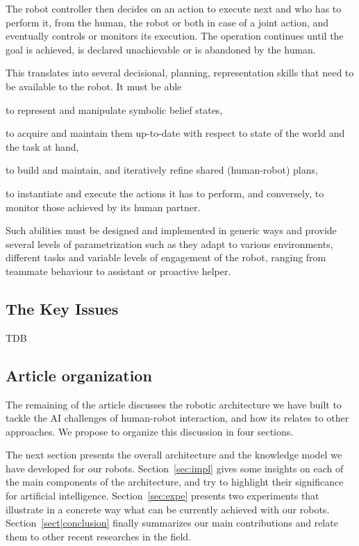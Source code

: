 \documentclass[preprint,3p,times]{elsarticle}
\begin{document}
The robot controller then decides on an action to execute next and who has to
perform it, from the human, the robot or both in case of a joint action, and
eventually controls or monitors its execution. The operation continues until the
goal is achieved, is declared unachievable or is abandoned by the human.

\begin{inparaenum}
This translates into several decisional, planning, representation skills that
need to be available to the robot. It must be able \item to represent and
manipulate symbolic belief states, \item to acquire and maintain them up-to-date
with respect to state of the world and the task at hand, \item to build and
maintain, and iteratively refine shared (human-robot) plans, \item to
instantiate and execute the actions it has to perform, and conversely,
to monitor those achieved by its human partner.
\end{inparaenum}

Such abilities must be designed and implemented in generic ways and
provide several levels of parametrization such as they adapt to
various environments, different tasks and variable levels of engagement of the
robot, ranging from teammate behaviour to assistant or proactive helper.

\subsection{The Key Issues}



TDB

\subsection{Article organization}

The remaining of the article discusses the robotic architecture we have built to
tackle the AI challenges of human-robot interaction, and how its relates to
other approaches. We propose to organize this discussion in four sections.

The next section presents the overall architecture and the knowledge model we
have developed for our robots. Section~\ref{sec:impl} gives some insights on
each of the main components of the architecture, and try to highlight their
significance for artificial intelligence. Section~\ref{sec:expe} presents two
experiments that illustrate in a concrete way what can be currently achieved
with our robots.  Section~\ref{sect|conclusion} finally summarizes our main
contributions and relate them to other recent researches in the field.
\end{document}
